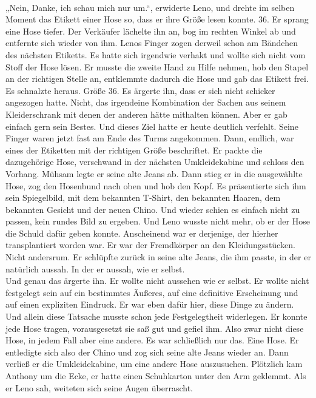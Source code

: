 \documentclass[ngerman,smalldemyvopaper,11pt,oneside,onecolumn,openright,extrafontsizes]{memoir}
\begin{document}
\vspace{0.5em} \\
„Nein, Danke, ich schau mich nur um.“, erwiderte Leno, und drehte im selben Moment das Etikett einer Hose so, dass er ihre Größe lesen konnte. 36. Er sprang eine Hose tiefer. Der Verkäufer lächelte ihn an, bog im rechten Winkel ab und entfernte sich wieder von ihm. Lenos Finger zogen derweil schon am Bändchen des nächsten Etiketts. Es hatte sich irgendwie verhakt und wollte sich nicht vom Stoff der Hose lösen. Er musste die zweite Hand zu Hilfe nehmen, hob den Stapel an der richtigen Stelle an, entklemmte dadurch die Hose und gab das Etikett frei. Es schnalzte heraus. Größe 36. Es ärgerte ihn, dass er sich nicht schicker angezogen hatte. Nicht, das irgendeine Kombination der Sachen aus seinem Kleiderschrank mit denen der anderen hätte mithalten können. Aber er gab einfach gern sein Bestes. Und dieses Ziel hatte er heute deutlich verfehlt. Seine Finger waren jetzt fast am Ende des Turms angekommen. Dann, endlich, war eines der Etiketten mit der richtigen Größe beschriftet. Er packte die dazugehörige Hose, verschwand in der nächsten Umkleidekabine und schloss den Vorhang. Mühsam legte er seine alte Jeans ab. Dann stieg er in die ausgewählte Hose, zog den Hosenbund nach oben und hob den Kopf. Es präsentierte sich ihm sein Spiegelbild, mit dem bekannten T-Shirt, den bekannten Haaren, dem bekannten Gesicht und der neuen Chino. Und wieder schien es einfach nicht zu passen, kein rundes Bild zu ergeben. Und Leno wusste nicht mehr, ob er der Hose die Schuld dafür geben konnte. Anscheinend war er derjenige, der hierher transplantiert worden war. Er war der Fremdkörper an den Kleidungsstücken. Nicht andersrum. Er schlüpfte zurück in seine alte Jeans, die ihm passte, in der er natürlich aussah. In der er aussah, wie er selbst.
\vspace{0.5em} \\
Und genau das ärgerte ihn. Er wollte nicht aussehen wie er selbst. Er wollte nicht festgelegt sein auf ein bestimmtes Äußeres, auf eine definitive Erscheinung und auf einen expliziten Eindruck. Er war eben dafür hier, diese Dinge zu ändern. Und allein diese Tatsache musste schon jede Festgelegtheit widerlegen. Er konnte jede Hose tragen, vorausgesetzt sie saß gut und gefiel ihm. Also zwar nicht diese Hose, in jedem Fall aber eine andere. Es war schließlich nur das. Eine Hose. Er entledigte sich also der Chino und zog sich seine alte Jeans wieder an. Dann verließ er die Umkleidekabine, um eine andere Hose auszusuchen. Plötzlich kam Anthony um die Ecke, er hatte einen Schuhkarton unter den Arm geklemmt. Als er Leno sah, weiteten sich seine Augen überrascht.
\end{document}
